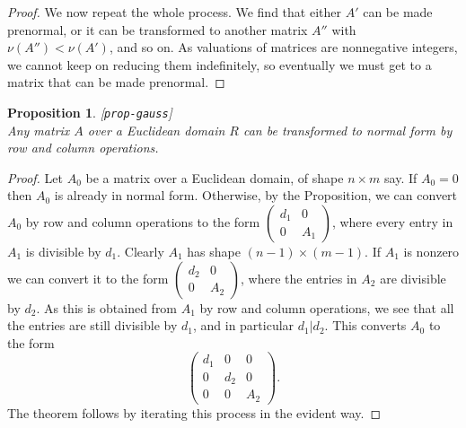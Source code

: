 \documentclass{amsart}
\newcommand{\lbl}[1]{\label{#1}\textup{[\texttt{#1}]}\ \\}
\newcommand{\lbl}{\label}
\newcommand{\tm}        {\times}
\newcommand{\blockmat}[4]{
 \left(\begin{array}{c|c} #1&#2 \\ \hline #3&#4\end{array}\right)}
\renewcommand{\:}{\colon}
\newtheorem{proposition}[theorem]{Proposition}
\theoremstyle{definition}
\begin{document}
\begin{proof}
 We now repeat the whole process.  We find that either $A'$ can be
 made prenormal, or it can be transformed to another matrix $A''$ with
 $\nu(A'')<\nu(A')$, and so on.  As valuations of matrices are
 nonnegative integers, we cannot keep on reducing them indefinitely,
 so eventually we must get to a matrix that can be made prenormal.
\end{proof}

\begin{proposition}\lbl{prop-gauss}
 Any matrix $A$ over a Euclidean domain $R$ can be transformed to
 normal form by row and column operations.
\end{proposition}
\begin{proof}
 Let $A_0$ be a matrix over a Euclidean domain, of shape $n\tm m$ say.
 If $A_0=0$ then $A_0$ is already in normal form.  Otherwise, by the
 Proposition, we can convert $A_0$ by row and column operations to the
 form $\blockmat{d_1}{0}{0}{A_1}$, where every entry in $A_1$ is
 divisible by $d_1$.  Clearly $A_1$ has shape $(n-1)\tm(m-1)$.  If
 $A_1$ is nonzero we can convert it to the form
 $\blockmat{d_2}{0}{0}{A_2}$, where the entries in $A_2$ are divisible
 by $d_2$.  As this is obtained from $A_1$ by row and column
 operations, we see that all the entries are still divisible by $d_1$,
 and in particular $d_1|d_2$.  This converts $A_0$ to the form
 \[ \left(\begin{array}{cc|c}
      d_1&0&0 \\ 0&d_2&0 \\ \hline 0&0&A_2
    \end{array}\right).
 \]
 The theorem follows by iterating this process in the evident way.
\end{proof}
\end{document}
